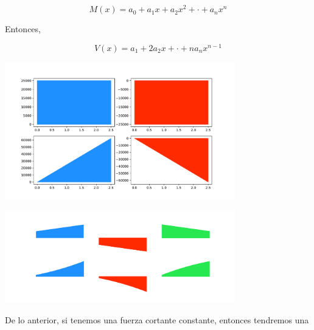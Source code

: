 \documentclass[12pt,letterpaper]{article}
\begin{document}
$$ M(x) = a_0 + a_1 x + a_2 x^2 + \cdot + a_n x^n $$

Entonces,

$$ V(x) = a_1 + 2 a_2 x + \cdot + n a_n x^{n-1} $$

\begin{center}
\includegraphics[width=0.75\textwidth]{code/dshape_01.pdf}
\end{center}

\begin{center}
\includegraphics[width=0.75\textwidth]{code/dshape_02.pdf}
\end{center}

De lo anterior, si tenemos una fuerza cortante constante, entonces tendremos una 
\end{document}
